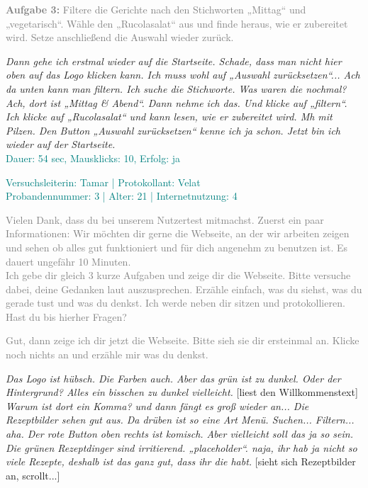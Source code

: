 \documentclass[parskip,10pt,abstracton]{scrartcl}
\begin{document}
\begin{appendix}
\textcolor{gray}{
\textbf{Aufgabe 3:} Filtere die Gerichte nach den Stichworten „Mittag“ und „vegetarisch“. Wähle den „Rucolasalat“ aus und finde heraus, wie er zubereitet wird. Setze anschließend die Auswahl wieder zurück.}

\textit{Dann gehe ich erstmal wieder auf die Startseite. Schade, dass man nicht hier oben auf das Logo klicken kann. Ich muss wohl auf „Auswahl zurücksetzen“... Ach da unten kann man filtern. Ich suche die Stichworte. Was waren die nochmal? Ach, dort ist „Mittag \& Abend“. Dann nehme ich das. Und klicke auf „filtern“. Ich klicke auf „Rucolasalat“ und kann lesen, wie er zubereitet wird. Mh mit Pilzen. Den Button „Auswahl zurücksetzen“ kenne ich ja schon. Jetzt bin ich wieder auf der Startseite.}\\
\textcolor{teal}{Dauer: 54 sec, Mausklicks: 10, Erfolg: ja}

\newpage
\textcolor{teal}{Versuchsleiterin: Tamar | Protokollant: Velat}\\
\textcolor{teal}{Probandennummer: 3 | Alter: 21 | Internetnutzung: 4}

\textcolor{gray}{
Vielen Dank, dass du bei unserem Nutzertest mitmachst.
Zuerst ein paar Informationen: Wir möchten dir gerne die Webseite, an der wir arbeiten zeigen und sehen ob alles gut funktioniert und für dich angenehm zu benutzen ist.
Es dauert ungefähr 10 Minuten. \\
Ich gebe dir gleich 3 kurze Aufgaben und zeige dir die Webseite.
Bitte versuche dabei, deine Gedanken laut auszusprechen. Erzähle einfach, was du siehst, was du gerade tust und was du denkst. Ich werde neben dir sitzen und protokollieren.
Hast du bis hierher Fragen?
}

\textcolor{gray}{
Gut, dann zeige ich dir jetzt die Webseite. Bitte sieh sie dir ersteinmal an. Klicke noch nichts an und erzähle mir was du denkst.
}

\textit{
Das Logo ist hübsch. Die Farben auch. Aber das grün ist zu dunkel. Oder der Hintergrund? Alles ein bisschen zu dunkel vielleicht.} [liest den Willkommenstext] \textit{Warum ist dort ein Komma? und dann fängt es groß wieder an... Die Rezeptbilder sehen gut aus. Da drüben ist so eine Art Menü. Suchen... Filtern... aha. Der rote Button oben rechts ist komisch. Aber vielleicht soll das ja so sein. Die grünen Rezeptdinger sind irritierend. „placeholder“. naja, ihr hab ja nicht so viele Rezepte, deshalb ist das ganz gut, dass ihr die habt.} [sieht sich Rezeptbilder an, scrollt...]


\end{appendix}
\end{document}
